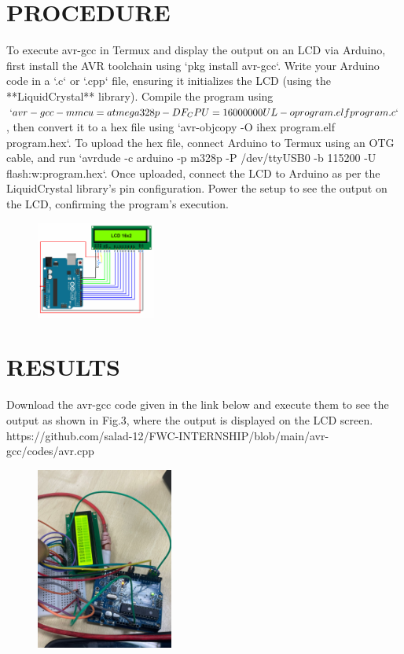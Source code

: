 \documentclass[conference]{IEEEtran}
\begin{document}
\section{PROCEDURE}
To execute avr-gcc in Termux and display the output on an LCD via Arduino, first install the AVR toolchain using `pkg install avr-gcc`. Write your Arduino code in a `.c` or `.cpp` file, ensuring it initializes the LCD (using the **LiquidCrystal** library). Compile the program using $`avr-gcc -mmcu=atmega328p -DF_CPU=16000000UL -o program.elf program.c`$, then convert it to a hex file using `avr-objcopy -O ihex program.elf program.hex`.
To upload the hex file, connect Arduino to Termux using an OTG cable, and run `avrdude -c arduino -p m328p -P /dev/ttyUSB0 -b 115200 -U flash:w:program.hex`. Once uploaded, connect the LCD to Arduino as per the LiquidCrystal library’s pin configuration. Power the setup to see the output on the LCD, confirming the program's execution.
 \begin{figure}[h]
	 \centering
	 \includegraphics[width=0.35\textwidth]{connec.png}
	 \caption{\label{fig:Connections}}
 \end{figure}
\section{RESULTS}
Download the avr-gcc code given in the link below and execute them to see the output as shown in Fig.3, where the output is displayed on the LCD screen.\\
https://github.com/salad-12/FWC-INTERNSHIP/blob/main/avr-gcc/codes/avr.cpp
\begin{figure}[h] 
	\centering 
	\includegraphics[width=0.4\textwidth]{avra.jpg}
	\caption{\label{fig:Result}}    
\end{figure}
\end{document}
